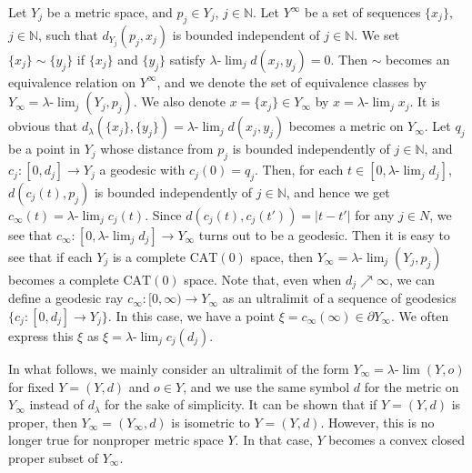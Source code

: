 \documentclass[12pt]{amsart}
\numberwithin{equation}{section}
\theoremstyle{plain}
\theoremstyle{definition}
\theoremstyle{remark}
\newcommand{\N}{{\mathbb N}}
\newcommand{\cat}[1]{\mathrm{CAT}(#1)}
\newcommand{\ulim}{\lambda{\text{-}}\!\lim}
\newcommand{\ray}[1]{[#1)}
\begin{document}
 Let $Y_j$ be a metric space, and $p_j \in  Y_j$, $j\in \N$. 
 Let $Y^{\infty}$ be a set of sequences $\{x_j\}$, $j \in \N$, such that 
 $d_{Y_j}(p_j,x_j)$ is bounded independent of $j \in \N$.
 We set $\{x_j\}\sim \{y_j\}$ if $\{x_j\}$ and $\{y_j\}$ satisfy 
 $\ulim_j d(x_j,y_j)=0$.  Then $\sim$ becomes an equivalence relation on
 $Y^{\infty}$, and we denote the set of equivalence classes by 
 $Y_{\infty}=\ulim_j (Y_j,p_j)$.  
 We also denote $x=\{x_j\}\in Y_{\infty}$ by $x=\ulim_j x_j$. 
 It is obvious that $d_{\lambda}(\{x_j\},\{y_j\})=\ulim_j d(x_j,y_j)$
 becomes a metric on $Y_{\infty}$. 
 Let $q_j$ be a point in $Y_j$ whose distance from $p_j$ is bounded
 independently of $j \in \N$, and $c_j\colon [0,d_j]\rightarrow Y_j$ a
 geodesic with $c_j(0)=q_j$.  
 Then, for each $t \in [0,\ulim_j d_j]$, $d(c_j(t),p_j)$ is
 bounded independently of $j\in \N$, and hence we get
 $c_{\infty}(t)=\ulim_j c_j(t)$. 
 Since $d(c_j(t),c_j(t'))=|t-t'|$ for any $j \in N$, we see that 
 $c_{\infty} \colon [0,\ulim_j d_j]\rightarrow Y_{\infty}$ turns out to
 be a geodesic.  
 Then it is easy to see that if each $Y_j$ is a complete $\cat{0}$
 space, then $Y_{\infty}=\ulim_j (Y_j,p_j)$ becomes a complete $\cat{0}$
 space.
 Note that, even when $d_j\nearrow\infty$,  we can define a geodesic ray 
 $c_{\infty}\colon \ray{0,\infty}\rightarrow Y_{\infty}$ as an
 ultralimit of a sequence of  geodesics 
 $\{c_j\colon [0,d_j]\rightarrow Y_j\}$. 
 In this case, we have a point 
 $\xi=c_{\infty}(\infty) \in \partial Y_{\infty}$. 
 We often express this $\xi$ as $\xi=\ulim_j c_j(d_j)$. 

 In what follows, we mainly consider an ultralimit of the form 
 $Y_{\infty}=\ulim (Y,o)$ for fixed $Y=(Y,d)$ and $o \in Y$, and 
 we use the same symbol $d$ for the metric on $Y_{\infty}$ instead of
 $d_{\lambda}$ for the sake of simplicity. 
 It can be shown that if $Y=(Y,d)$ is proper, then 
  $Y_{\infty}=(Y_{\infty},d)$ is isometric to $Y=(Y,d)$. 
 However, this is no longer true for nonproper metric space $Y$. 
 In that case, $Y$ becomes a convex closed proper subset of
 $Y_{\infty}$. 
 
\end{document}
